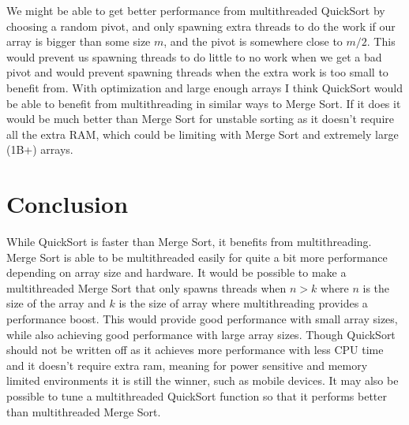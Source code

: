 \documentclass[12pt,letterpaper]{report}
\begin{document}
	We might be able to get better performance from multithreaded QuickSort by choosing a random pivot, and only spawning extra threads to do the work if our array is bigger than some size $m$, and the pivot is somewhere close to $m/2$. This would prevent us spawning threads to do little to no work when we get a bad pivot and would prevent spawning threads when the extra work is too small to benefit from. With optimization and large enough arrays I think QuickSort would be able to benefit from multithreading in similar ways to Merge Sort. If it does it would be much better than Merge Sort for unstable sorting as it doesn't require all the extra RAM, which could be limiting with Merge Sort and extremely large (1B+) arrays.
			
	\section*{Conclusion}
	
	While QuickSort is faster than Merge Sort, it benefits from multithreading. Merge Sort is able to be multithreaded easily for quite a bit more performance depending on array size and hardware. It would be possible to make a multithreaded Merge Sort that only spawns threads when $n > k$ where $n$ is the size of the array and $k$ is the size of array where multithreading provides a performance boost. This would provide good performance with small array sizes, while also achieving good performance with large array sizes. Though QuickSort should not be written off as it achieves more performance with less CPU time and it doesn't require extra ram, meaning for power sensitive and memory limited environments it is still the winner, such as mobile devices. It may also be possible to tune a multithreaded QuickSort function so that it performs better than multithreaded Merge Sort.
\end{document}
